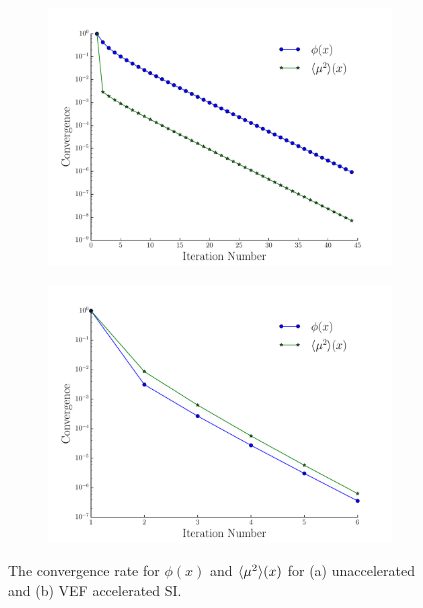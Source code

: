 	\begin{figure}
	\centering
	\begin{subfigure}{.515\textwidth}
		\centering
		\includegraphics[width=\textwidth]{figs/si.pdf}
		\caption{}
		\label{fig:si}
	\end{subfigure}
	\hspace{-2em}
	\begin{subfigure}{.515\textwidth}
		\centering
		\includegraphics[width=\textwidth]{figs/vef.pdf} 
		\caption{}
		\label{fig:vef}
	\end{subfigure}
	\caption{The convergence rate for $\phi(x)$ and $\langle \mu^2 \rangle(x)$ for (a) unaccelerated and (b) VEF accelerated SI. }
	\end{figure}

